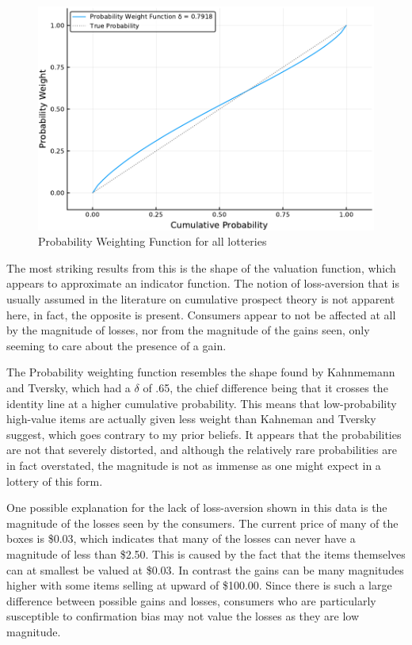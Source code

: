 \documentclass[12pt, letterpaper]{paper}
\begin{document}
\begin{figure}[htb]
\centering
\includegraphics[width=.9\linewidth]{../Scripts/ProbWeightSingle.pdf}
\caption{\label{fig:single-prob}Probability Weighting Function for all lotteries}
\end{figure}

The most striking results from this is the shape of the valuation
function, which appears to approximate an indicator function. The
notion of loss-aversion that is usually assumed in the literature on
cumulative prospect theory is not apparent here, in fact, the opposite
is present. Consumers appear to not be affected at all by the
magnitude of losses, nor from the magnitude of the gains seen, only
seeming to care about the presence of a gain.

The Probability weighting function resembles the shape found by
Kahnmemann and Tversky, which had a $\delta$ of .65, the chief difference
being that it crosses the identity line at a higher cumulative
probability. This means that low-probability high-value items are
actually given less weight than Kahneman and Tversky suggest, which
goes contrary to my prior beliefs. It appears that the probabilities
are not that severely distorted, and although the relatively rare
probabilities are in fact overstated, the magnitude is not as immense
as one might expect in a lottery of this form.

One possible explanation for the lack of loss-aversion shown in this
data is the magnitude of the losses seen by the consumers. The current
price of many of the boxes is \$0.03, which indicates that many of the
losses can never have a magnitude of less than \$2.50. This is caused
by the fact that the items themselves can at smallest be valued at
\$0.03. In contrast the gains can be many magnitudes higher with some
items selling at upward of \$100.00. Since there is such a large
difference between possible gains and losses, consumers who are
particularly susceptible to confirmation bias may not value the losses
as they are low magnitude.
\end{document}
